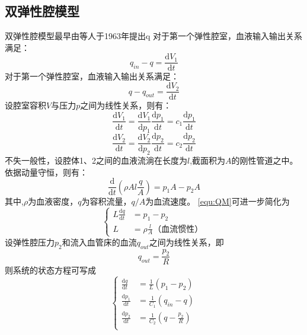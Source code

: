 \subsection{双弹性腔模型}
双弹性腔模型最早由等人于1963年提出q
对于第一个弹性腔室，血液输入输出关系满足：
\begin{equation}
    \label{equ:QS1}
    q_{in}-q=\frac{\mathrm{d} V_{1}}{\mathrm{d} t}
\end{equation}
对于第一个弹性腔室，血液输入输出关系满足：
\begin{equation}
    \label{equ:QS2}
    q-q_{out}=\frac{\mathrm{d} V_{2}}{\mathrm{d} t}
\end{equation}
设腔室容积$V$与压力$p$之间为线性关系，则有：
\begin{equation}
    \label{equ:QSV1}
    \frac{\mathrm{d} V_{1}}{\mathrm{d} t}
    =\frac{\mathrm{d} V_{1}}{\mathrm{d} p_{1}}\frac{\mathrm{d} p_{1}}{\mathrm{d} t}
    =c_{1}\frac{\mathrm{d} p_{1}}{\mathrm{d} t}
\end{equation}
\begin{equation}
    \label{equ:QSV2}
    \frac{\mathrm{d} V_{2}}{\mathrm{d} t}
    =\frac{\mathrm{d} V_{2}}{\mathrm{d} p_{2}}\frac{\mathrm{d} p_{2}}{\mathrm{d} t}
    =c_{2}\frac{\mathrm{d} p_{2}}{\mathrm{d} t}
\end{equation}
不失一般性，设腔体1、2之间的血液流淌在长度为$l$,截面积为$A$的刚性管道之中。依据动量守恒，则有：
\begin{equation}
    \label{equ:QM}
    \frac{\mathrm{d}}{\mathrm{d} t}\left ( \rho Al\frac{q}{A} \right )=p_{1}A-p_{2}A
\end{equation}
其中,$\rho$为血液密度，$q$为容积流量，$q/A$为血流速度。
\autoref{equ:QM}可进一步简化为
\begin{equation}
    \left \{
    \begin{aligned}
        L\frac{\mathrm{d} q}{\mathrm{d} t} &= p_{1}-p_{2} \\
        L &=\rho \frac{l}{A} \text{（血流惯性）}
    \end{aligned}
    \right.
\end{equation}
设弹性腔压力$p_{2}$和流入血管床的血流$q_{out}$之间为线性关系，即
\begin{equation}
    \label{equ:pq}
    q_{out}=\frac{p_{2}}{R}
\end{equation}
则系统的状态方程可写成
\begin{equation}
    \left \{
    \begin{aligned}
        \frac{\mathrm{d} q}{\mathrm{d} t} &= \frac{1}{L}(p_{1}-p_{2}) \\
        \frac{\mathrm{d} p_{1}}{\mathrm{d} t} &= \frac{1}{C_{1}}(q_{in}-q) \\
        \frac{\mathrm{d} p_{2}}{\mathrm{d} t} &= \frac{1}{C_{2}}(q-\frac{p_{2}}{R}) \\
    \end{aligned}
    \right.
\end{equation}
